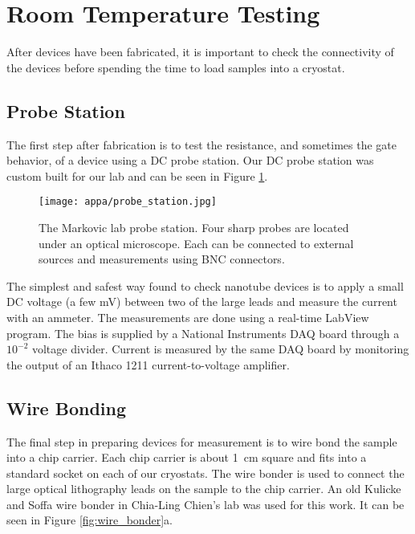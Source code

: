 \section{Room Temperature Testing}

After devices have been fabricated, it is important to check the connectivity of the devices before spending the time to load samples into a cryostat.

\subsection{Probe Station}
\label{subsec:probe_station}

The first step after fabrication is to test the resistance, and sometimes the gate behavior, of a device using a DC probe station. Our DC probe station was custom built for our lab and can be seen in Figure \ref{fig:probe_station}.

\begin{figure}
	\centering
	\texttt{[image: appa/probe\_station.jpg]}
	\caption{The Markovic lab probe station. Four sharp probes are located under an optical microscope. Each can be connected to external sources and measurements using BNC connectors.}
	\label{fig:probe_station}
\end{figure}

The simplest and safest way found to check nanotube devices is to apply a small DC voltage (a few \si{\milli\volt}) between two of the large leads and measure the current with an ammeter. The measurements are done using a real-time LabView program. The bias is supplied by a National Instruments DAQ board through a $10^{-2}$ voltage divider. Current is measured by the same DAQ board by monitoring the output of an Ithaco 1211 current-to-voltage amplifier. 

\subsection{Wire Bonding}
\label{subsec:wire_bonding}

The final step in preparing devices for measurement is to wire bond the sample into a chip carrier. Each chip carrier is about \SI{1}{\centi\meter} square and fits into a standard socket on each of our cryostats. The wire bonder is used to connect the large optical lithography leads on the sample to the chip carrier. An old Kulicke and Soffa wire bonder in Chia-Ling Chien's lab was used for this work. It can be seen in Figure \ref{fig:wire_bonder}a.

